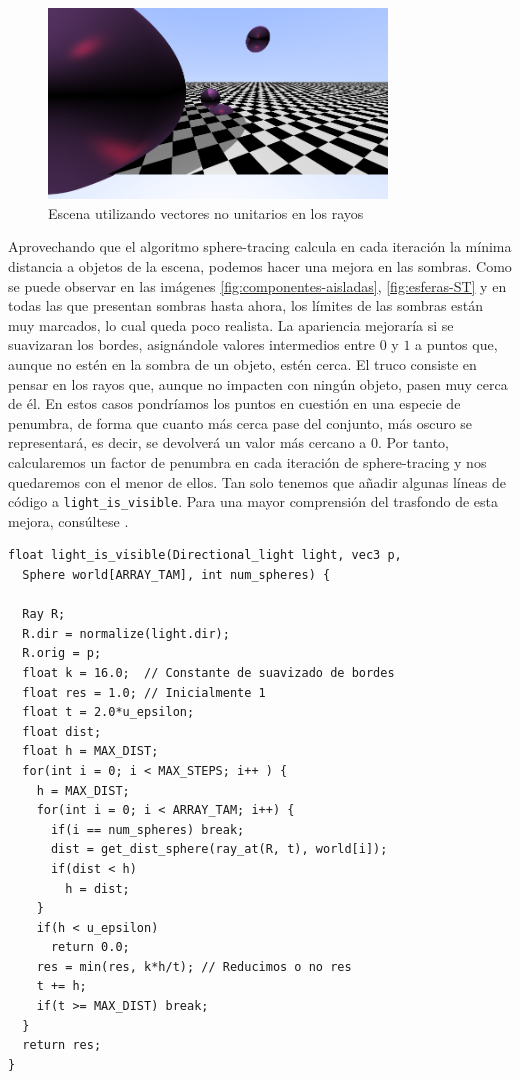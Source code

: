 \begin{figure} [ht]
    \centering
    \includegraphics[width=9cm]{img/C9/vectores-no-normalizados.png}
    \caption{Escena utilizando vectores no unitarios en los rayos}
    \label{fig:vectores-no-normalizados}
\end{figure}

Aprovechando que el algoritmo sphere-tracing calcula en cada iteración la mínima distancia a objetos de la escena, podemos hacer una mejora en las sombras. Como se puede observar en las imágenes \ref{fig:componentes-aisladas}, \ref{fig:esferas-ST} y en todas las que presentan sombras hasta ahora, los límites de las sombras están muy marcados, lo cual queda poco realista. La apariencia mejoraría si se suavizaran los bordes, asignándole valores intermedios entre $0$ y $1$ a puntos que, aunque no estén en la sombra de un objeto, estén cerca. El truco consiste en pensar en los rayos que, aunque no impacten con ningún objeto, pasen muy cerca de él. En estos casos pondríamos los puntos en cuestión en una especie de penumbra, de forma que cuanto más cerca pase del conjunto, más oscuro se representará, es decir, se devolverá un valor más cercano a $0$. Por tanto, calcularemos un factor de penumbra en cada iteración de sphere-tracing y nos quedaremos con el menor de ellos. Tan solo tenemos que añadir algunas líneas de código a \verb|light_is_visible|. Para una mayor comprensión del trasfondo de esta mejora, consúltese \cite{shadows}.

\begin{lstlisting}
float light_is_visible(Directional_light light, vec3 p, 
  Sphere world[ARRAY_TAM], int num_spheres) {
  
  Ray R;
  R.dir = normalize(light.dir);
  R.orig = p;
  float k = 16.0;  // Constante de suavizado de bordes
  float res = 1.0; // Inicialmente 1
  float t = 2.0*u_epsilon;
  float dist;
  float h = MAX_DIST;
  for(int i = 0; i < MAX_STEPS; i++ ) {
    h = MAX_DIST;
    for(int i = 0; i < ARRAY_TAM; i++) {
      if(i == num_spheres) break;
      dist = get_dist_sphere(ray_at(R, t), world[i]);
      if(dist < h)
        h = dist;
    }
    if(h < u_epsilon)
      return 0.0;
    res = min(res, k*h/t); // Reducimos o no res
    t += h;
    if(t >= MAX_DIST) break;
  }
  return res;
}
\end{lstlisting}

